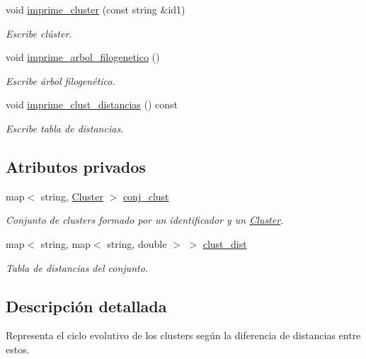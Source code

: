 \begin{DoxyCompactItemize}
void \hyperlink{class_cjt___clusters_a17f8056edf94da434c058b0a7758b93c}{imprime\+\_\+cluster} (const string \&id1)
\begin{DoxyCompactList}\small\item\em Escribe clúster. \end{DoxyCompactList}\item 
void \hyperlink{class_cjt___clusters_a95262506a2fdc5455ce104fb84649ee9}{imprime\+\_\+arbol\+\_\+filogenetico} ()
\begin{DoxyCompactList}\small\item\em Escribe árbol filogenético. \end{DoxyCompactList}\item 
void \hyperlink{class_cjt___clusters_a3f56a11d83d14d8dc58df32ea70163fa}{imprime\+\_\+clust\+\_\+distancias} () const
\begin{DoxyCompactList}\small\item\em Escribe tabla de distancias. \end{DoxyCompactList}\end{DoxyCompactItemize}
\subsection*{Atributos privados}
\begin{DoxyCompactItemize}
\item 
map$<$ string, \hyperlink{class_cluster}{Cluster} $>$ \hyperlink{class_cjt___clusters_a1202e93aafa953b2dc9a76d03f056b08}{conj\+\_\+clust}
\begin{DoxyCompactList}\small\item\em Conjunto de clusters formado por un identificador y un \hyperlink{class_cluster}{Cluster}. \end{DoxyCompactList}\item 
map$<$ string, map$<$ string, double $>$ $>$ \hyperlink{class_cjt___clusters_a2e0931084578a4abb26d17bf289628d2}{clust\+\_\+dist}
\begin{DoxyCompactList}\small\item\em Tabla de distancias del conjunto. \end{DoxyCompactList}\end{DoxyCompactItemize}


\subsection{Descripción detallada}
Representa el ciclo evolutivo de los clusters según la diferencia de distancias entre estos. 

